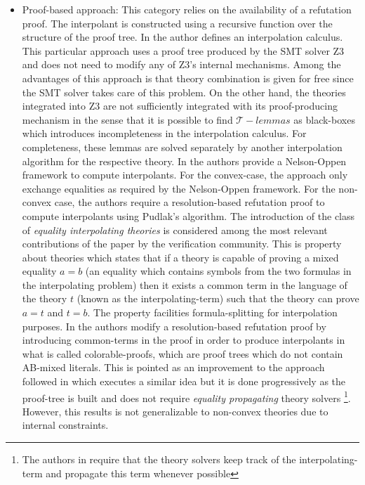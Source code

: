 \begin{itemize}
  \item Proof-based approach: This category relies on the availability
    of a refutation proof.  The interpolant is constructed using a
    recursive function over the structure of the proof
    tree. In \cite{10.1007/978-3-540-24730-2_2,mcmillan2011interpolants}
    the author defines an interpolation calculus. This particular
    approach uses a proof tree produced by the SMT solver Z3 
    and does not need to modify any of Z3's internal mechanisms.
    Among the advantages of this approach is that
    theory combination is given for free since the SMT solver takes care of this
    problem. On the other hand, the theories integrated into Z3 are not sufficiently integrated with its
    proof-producing mechanism in the sense that it is possible to find $\mathcal{T}-lemmas$
    as black-boxes which introduces incompleteness in the
    interpolation calculus. For completeness, these lemmas are 
    solved separately by another interpolation algorithm for the respective
    theory. 
    In \cite{10.1007/11532231_26} the authors provide a Nelson-Oppen framework
    to compute interpolants. For the convex-case, the approach only 
    exchange equalities as required by the Nelson-Oppen framework. For
    the non-convex case, the authors require a resolution-based refutation proof
    to compute interpolants using Pudlak's algorithm. The introduction of the
    class of \emph{equality interpolating theories} is 
    considered among the most relevant contributions of the paper 
    by the verification community. This is property about theories which states
    that if a theory is capable of proving a mixed equality $a = b$ (an equality
    which contains symbols from the two formulas in the interpolating problem)
    then it exists a common term in the language of the theory $t$ (known as
    the interpolating-term) such that 
    the theory can prove $a = t$ and $t = b$. The property facilities 
    formula-splitting for interpolation purposes.
    In \cite{10.1007/978-3-642-00768-2_34} the authors modify a 
    resolution-based refutation proof by introducing common-terms in 
    the proof in order to produce interpolants in what is called
    colorable-proofs, which are proof trees which do not contain AB-mixed
    literals. This is pointed as an improvement to the approach followed 
    in \cite{10.1007/11532231_26} which executes a similar idea but it is done 
    progressively as the proof-tree is built and does not require 
   \emph{equality propagating} theory solvers
    \footnote{The authors in \cite{10.1007/11532231_26} require that 
      the theory solvers keep track of the interpolating-term 
      and propagate this term whenever
    possible}. 
    However, this results is not generalizable
    to non-convex theories due to internal constraints.


\end{itemize}
